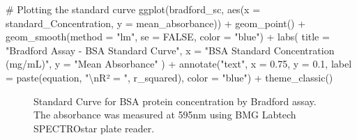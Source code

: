 \documentclass[
  letterpaper,
  DIV=11,
  numbers=noendperiod]{scrreprt}
\newenvironment{Shaded}{\begin{snugshade}}{\end{snugshade}}
\newcommand{\AttributeTok}[1]{\textcolor[rgb]{0.40,0.45,0.13}{#1}}
\newcommand{\CommentTok}[1]{\textcolor[rgb]{0.37,0.37,0.37}{#1}}
\newcommand{\ConstantTok}[1]{\textcolor[rgb]{0.56,0.35,0.01}{#1}}
\newcommand{\FloatTok}[1]{\textcolor[rgb]{0.68,0.00,0.00}{#1}}
\newcommand{\FunctionTok}[1]{\textcolor[rgb]{0.28,0.35,0.67}{#1}}
\newcommand{\NormalTok}[1]{\textcolor[rgb]{0.00,0.23,0.31}{#1}}
\newcommand{\SpecialCharTok}[1]{\textcolor[rgb]{0.37,0.37,0.37}{#1}}
\newcommand{\StringTok}[1]{\textcolor[rgb]{0.13,0.47,0.30}{#1}}
\begin{document}
\begin{Shaded}
\begin{Highlighting}[]
\CommentTok{\# Plotting the standard curve}
\FunctionTok{ggplot}\NormalTok{(bradford\_sc, }\FunctionTok{aes}\NormalTok{(}\AttributeTok{x =}\NormalTok{ standard\_Concentration, }\AttributeTok{y =}\NormalTok{ mean\_absorbance)) }\SpecialCharTok{+}
  \FunctionTok{geom\_point}\NormalTok{() }\SpecialCharTok{+}
  \FunctionTok{geom\_smooth}\NormalTok{(}\AttributeTok{method =} \StringTok{"lm"}\NormalTok{, }\AttributeTok{se =} \ConstantTok{FALSE}\NormalTok{, }\AttributeTok{color =} \StringTok{"blue"}\NormalTok{) }\SpecialCharTok{+}
  \FunctionTok{labs}\NormalTok{(}
    \AttributeTok{title =} \StringTok{"Bradford Assay {-} BSA Standard Curve"}\NormalTok{,}
    \AttributeTok{x =} \StringTok{"BSA Standard Concentration (mg/mL)"}\NormalTok{,}
    \AttributeTok{y =} \StringTok{"Mean Absorbance"}
\NormalTok{  ) }\SpecialCharTok{+}
  \FunctionTok{annotate}\NormalTok{(}\StringTok{"text"}\NormalTok{, }\AttributeTok{x =} \FloatTok{0.75}\NormalTok{, }\AttributeTok{y =} \FloatTok{0.1}\NormalTok{, }\AttributeTok{label =} \FunctionTok{paste}\NormalTok{(equation, }\StringTok{"}\SpecialCharTok{\textbackslash{}n}\StringTok{R² = "}\NormalTok{, r\_squared), }\AttributeTok{color =} \StringTok{"blue"}\NormalTok{) }\SpecialCharTok{+}
  \FunctionTok{theme\_classic}\NormalTok{()}
\end{Highlighting}
\end{Shaded}

\begin{figure}[H]


\caption{\label{fig-brad-stdcurve}Standard Curve for BSA protein
concentration by Bradford assay. The absorbance was measured at 595nm
using BMG Labtech SPECTROstar plate reader.}

\end{figure}%
\end{document}
